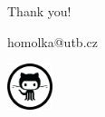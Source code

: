 \documentclass[12pt]{beamer}\usepackage[]{graphicx}\usepackage[]{color}
\begin{document}

\begin{frame}\centering\Large
Thank you! \bigskip 

homolka@utb.cz\bigskip 

\href{https://github.com/luboRprojects/RseminarModels}{\includegraphics[width=0.1\textwidth,height=0.1\textheight,keepaspectratio]{./Images/github}}



\end{frame}
\end{document}
